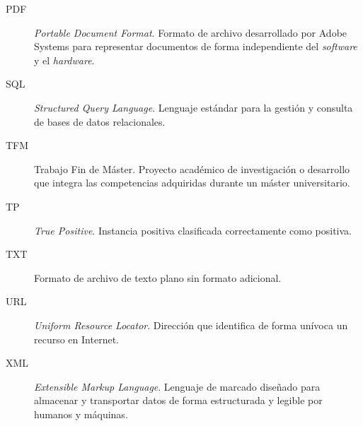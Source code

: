 \begin{description}
  \item[PDF] \textit{Portable Document Format}. Formato de archivo desarrollado por Adobe Systems para representar documentos de forma independiente del \textit{software} y el \textit{hardware}.

  \item[SQL] \textit{Structured Query Language}. Lenguaje estándar para la gestión y consulta de bases de datos relacionales.

  \item[TFM] Trabajo Fin de Máster. Proyecto académico de investigación o desarrollo que integra las competencias adquiridas durante un máster universitario.

  \item[TP] \textit{True Positive}. Instancia positiva clasificada correctamente como positiva.

  \item[TXT] Formato de archivo de texto plano sin formato adicional.

  \item[URL] \textit{Uniform Resource Locator}. Dirección que identifica de forma unívoca un recurso en Internet.

  \item[XML] \textit{Extensible Markup Language}. Lenguaje de marcado diseñado para almacenar y transportar datos de forma estructurada y legible por humanos y máquinas.

\end{description}
